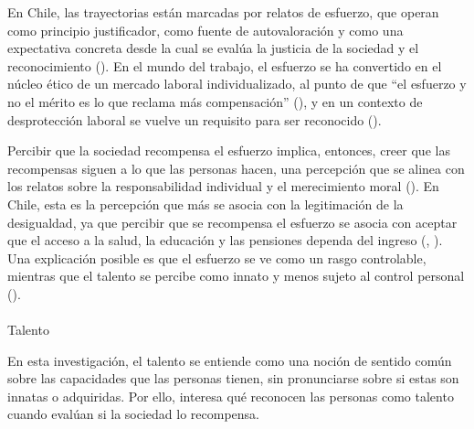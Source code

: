 \documentclass[
  spanish,
  a4paper,
  oneside]{scrbook}
\makeatletter
\let\oldparagraph\paragraph
\renewcommand{\paragraph}{
    \@ifstar
      \xxxParagraphStar
      \xxxParagraphNoStar
  }
\newcommand{\xxxParagraphStar}[1]{\oldparagraph*{#1}\mbox{}}
\newcommand{\xxxParagraphNoStar}[1]{\oldparagraph{#1}\mbox{}}
\makeatother
\begin{document}
En Chile, las trayectorias están marcadas por relatos de esfuerzo, que
operan como principio justificador, como fuente de autovaloración y como
una expectativa concreta desde la cual se evalúa la justicia de la
sociedad y el reconocimiento
(). En el mundo del trabajo, el esfuerzo se ha
convertido en el núcleo ético de un mercado laboral individualizado, al
punto de que ``el esfuerzo y no el mérito es lo que reclama más
compensación'' (), y
en un contexto de desprotección laboral se vuelve un requisito para ser
reconocido ().

Percibir que la sociedad recompensa el esfuerzo implica, entonces, creer
que las recompensas siguen a lo que las personas hacen, una percepción
que se alinea con los relatos sobre la responsabilidad individual y el
merecimiento moral (). En Chile, esta es la percepción que más se asocia con la
legitimación de la desigualdad, ya que percibir que se recompensa el
esfuerzo se asocia con aceptar que el acceso a la salud, la educación y
las pensiones dependa del ingreso
(,
).
Una explicación posible es que el esfuerzo se ve como un rasgo
controlable, mientras que el talento se percibe como innato y menos
sujeto al control personal
().

\paragraph{Talento}\label{talento}

En esta investigación, el talento se entiende como una noción de sentido
común sobre las capacidades que las personas tienen, sin pronunciarse
sobre si estas son innatas o adquiridas. Por ello, interesa qué
reconocen las personas como talento cuando evalúan si la sociedad lo
recompensa.
\end{document}
